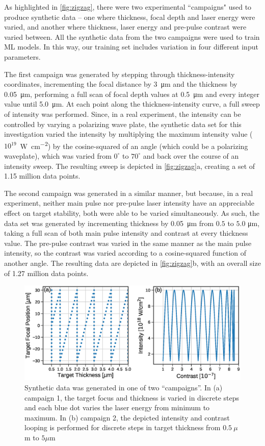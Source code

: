 As highlighted in \autoref{fig:zigzag}, there were two experimental ``campaigns" used to produce synthetic data -- one where thickness, focal depth and laser energy were varied, and another where thickness, laser energy and pre-pulse contrast were varied between. All the synthetic data from the two campaigns were used to train \gls{ML} models. In this way, our training set includes variation in four different input parameters.

The first campaign was generated by stepping through thickness-intensity coordinates, incrementing the focal distance by \SI{3}{\micro \meter} and the thickness by \SI{0.05}{\micro \meter}, performing a full scan of focal depth values at \SI{0.5}{\micro \meter} and every integer value until \SI{5.0}{\micro \meter}.  At each point along the thickness-intensity curve, a full sweep of intensity was performed.  Since, in a real experiment, the intensity can be controlled by varying a polarizing wave plate, the synthetic data set for this investigation varied the intensity by multiplying the maximum intensity value ($10^{19}$~\unit{W . cm^{-2}}) by the cosine-squared of an angle (which could be a polarizing waveplate), which was varied from $0^{\circ}$ to $70^{\circ}$ and back over the course of an intensity sweep.  The resulting sweep is depicted in \autoref{fig:zigzag}a, creating a set of 1.15 million data points.  

The second campaign was generated in a similar manner, but because, in a real experiment, neither main pulse nor pre-pulse laser intensity have an appreciable effect on target stability, both were able to be varied simultaneously.  As such, the data set was generated by incrementing thickness by \SI{0.05}{\micro \meter} from $0.5$ to $5.0$ \unit{\micro \meter}, taking a full scan of both main pulse intensity and contrast at every thickness value.  The pre-pulse contrast was varied in the same manner as the main pulse intensity, so the contrast was varied according to a cosine-squared function of another angle.  The resulting data are depicted in \autoref{fig:zigzag}b, with an overall size of 1.27 million data points.

\begin{figure}
	\centering
	\includegraphics[width=6.5in]{planning/images/paper2/fig10.eps}
	\caption{Synthetic data was generated in one of two ``campaigns''. In (a) campaign 1, the target focus and thickness is varied in discrete steps and each blue dot varies the laser energy from minimum to maximum. In (b) campaign 2, the depicted intensity and contrast looping is performed for discrete steps in target thickness from $0.5~\mu$m to $5\mu$m}
	\label{fig:zigzag}
\end{figure}

